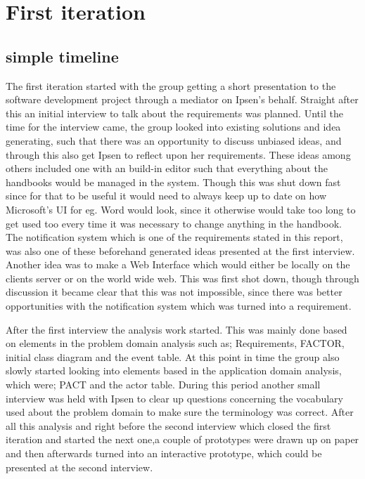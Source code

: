 \section{First iteration}
\subsection{simple timeline}
The first iteration started with the group getting a short presentation to the software development project through a mediator on Ipsen's behalf.
Straight after this an initial interview to talk about the requirements was planned.
Until the time for the interview came, the group looked into existing solutions and idea generating, such that there was an opportunity to discuss unbiased ideas, and through this also get Ipsen to reflect upon her requirements.
These ideas among others included one with an build-in editor such that everything about the handbooks would be managed in the system.
Though this was shut down fast since for that to be useful it would need to always keep up to date on how Microsoft's UI for eg. Word would look, since it otherwise would take too long to get used too every time it was necessary to change anything in the handbook.
The notification system which is one of the requirements stated in this report, was also one of these beforehand generated ideas presented at the first interview. 
Another idea was to make a Web Interface which would either be locally on the clients server or on the world wide web. This was first shot down, though through discussion it became clear that this was not impossible, since there was better opportunities with the notification system which was turned into a requirement.

After the first interview the analysis work started.
This was mainly done based on elements in the problem domain analysis such as; Requirements, FACTOR, initial class diagram and the event table.
At this point in time the group also slowly started looking into elements based in the application domain analysis, which were; PACT and the actor table.
During this period another small interview was held with Ipsen to clear up questions concerning the vocabulary used about the problem domain to make sure the terminology was correct.
After all this analysis and right before the second interview which closed the first iteration and started the next one,a couple of prototypes were drawn up on paper and then afterwards turned into an interactive prototype, which could be presented at the second interview.

